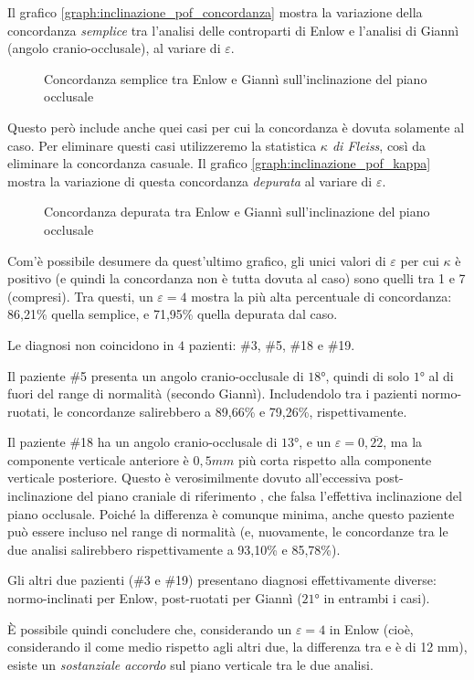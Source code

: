 Il grafico \vref{graph:inclinazione_pof_concordanza} mostra la variazione della concordanza \emph{semplice} tra l'analisi delle controparti di Enlow e l'analisi di Giannì (angolo cranio-occlusale), al variare di $\varepsilon$.

\begin{figure}[ht!]
\centering

\caption{Concordanza semplice tra Enlow e Giannì sull'inclinazione del piano occlusale}
\label{graph:inclinazione_pof_concordanza}
\end{figure}

Questo però include anche quei casi per cui la concordanza è dovuta solamente al caso. Per eliminare questi casi utilizzeremo la statistica \emph{$\kappa$ di Fleiss}, così da eliminare la concordanza casuale. Il grafico \vref{graph:inclinazione_pof_kappa} mostra la variazione di questa concordanza \emph{depurata} al variare di $\varepsilon$.

\begin{figure}[ht!]
\centering

\caption{Concordanza depurata tra Enlow e Giannì sull'inclinazione del piano occlusale}
\label{graph:inclinazione_pof_kappa}
\end{figure}

Com'è possibile desumere da quest'ultimo grafico, gli unici valori di $\varepsilon$ per cui $\kappa$ è positivo (e quindi la concordanza non è tutta dovuta al caso) sono quelli tra 1 e 7 (compresi). Tra questi, un $\varepsilon = 4$ mostra la più alta percentuale di concordanza: 86,21\% quella semplice, e 71,95\% quella depurata dal caso.

Le diagnosi non coincidono in $4$ pazienti: \#3, \#5, \#18 e \#19.

Il paziente \#5 presenta un angolo cranio-occlusale di $18°$, quindi di solo $1°$ al di fuori del range di normalità (secondo Giannì). Includendolo tra i pazienti normo-ruotati, le concordanze salirebbero a 89,66\% e 79,26\%, rispettivamente.

Il paziente \#18 ha un angolo cranio-occlusale di $13°$, e un $\varepsilon = 0,\overline{22}$, ma la componente verticale anteriore è $0,5 mm$ più corta rispetto alla componente verticale posteriore. Questo è verosimilmente dovuto all'eccessiva post-inclinazione del piano craniale di riferimento , che falsa l'effettiva inclinazione del piano occlusale. Poiché la differenza è comunque minima, anche questo paziente può essere incluso nel range di normalità (e, nuovamente, le concordanze tra le due analisi salirebbero rispettivamente a 93,10\% e 85,78\%).

Gli altri due pazienti (\#3 e \#19) presentano diagnosi effettivamente diverse: normo-inclinati per Enlow, post-ruotati per Giannì ($21°$ in entrambi i casi).

È possibile quindi concludere che, considerando un $\varepsilon = 4$ in Enlow (cioè, considerando il  come medio rispetto agli altri due, la differenza tra  e  è di 12 mm), esiste un \emph{sostanziale accordo} sul piano verticale tra le due analisi.